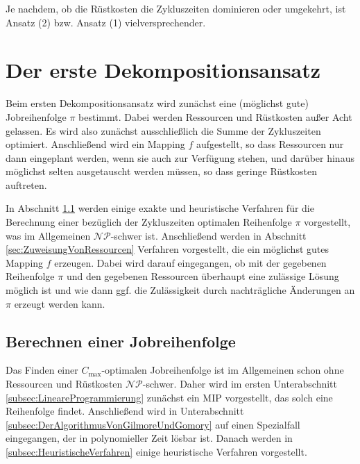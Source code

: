 \documentclass{scrreprt}
\begin{document}
Je nachdem, ob die Rüstkosten die Zykluszeiten dominieren oder umgekehrt, ist Ansatz (2) bzw. Ansatz (1) vielversprechender.


\chapter{Der erste Dekompositionsansatz}
\label{chap:DerErsteDekompositionsansatz}
Beim ersten Dekompositionsansatz wird zunächst eine (möglichst gute) Jobreihenfolge $\pi$ bestimmt.
Dabei werden Ressourcen und Rüstkosten außer Acht gelassen. 
Es wird also zunächst ausschließlich die Summe der Zykluszeiten optimiert. Anschließend wird ein Mapping $f$ aufgestellt,
so dass Ressourcen nur dann eingeplant werden, wenn sie auch zur Verfügung stehen, und darüber hinaus
möglichst selten ausgetauscht werden müssen, so dass geringe Rüstkosten auftreten.

In Abschnitt \ref{sec:BerechnenEinerJobreihenfolge} werden einige exakte und heuristische Verfahren für die
Berechnung einer bezüglich der Zykluszeiten optimalen Reihenfolge $\pi$ vorgestellt, was im Allgemeinen $\mathcal{NP}$-schwer ist.
Anschließend werden in Abschnitt \ref{sec:ZuweisungVonRessourcen} Verfahren vorgestellt, die ein möglichst gutes Mapping $f$ erzeugen.
Dabei wird darauf eingegangen, ob mit der gegebenen Reihenfolge $\pi$ und den gegebenen Ressourcen
überhaupt eine zulässige Lösung möglich ist und wie dann ggf. die Zulässigkeit durch nachträgliche Änderungen an $\pi$
erzeugt werden kann.

\section{Berechnen einer Jobreihenfolge}
\label{sec:BerechnenEinerJobreihenfolge}
Das Finden einer $C_{\max}$-optimalen Jobreihenfolge ist im Allgemeinen schon ohne Ressourcen und Rüstkosten $\mathcal{NP}$-schwer.
Daher wird im ersten Unterabschnitt \ref{subsec:LineareProgrammierung} zunächst ein MIP vorgestellt,
das solch eine Reihenfolge findet.
Anschließend wird in Unterabschnitt \ref{subsec:DerAlgorithmusVonGilmoreUndGomory} auf einen Spezialfall eingegangen, der in polynomieller Zeit lösbar ist.
Danach werden in \ref{subsec:HeuristischeVerfahren} einige heuristische Verfahren vorgestellt.
\end{document}
